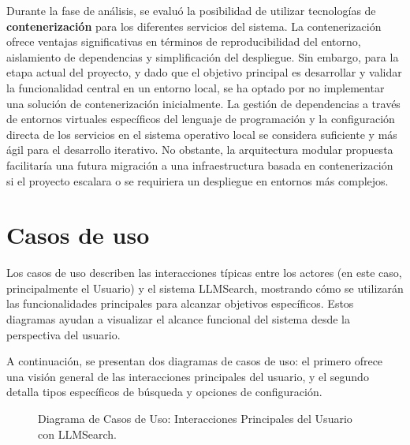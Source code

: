 Durante la fase de análisis, se evaluó la posibilidad de utilizar tecnologías de \textbf{contenerización} para los diferentes servicios del sistema. La contenerización ofrece ventajas significativas en términos de reproducibilidad del entorno, aislamiento de dependencias y simplificación del despliegue. Sin embargo, para la etapa actual del proyecto, y dado que el objetivo principal es desarrollar y validar la funcionalidad central en un entorno local, se ha optado por no implementar una solución de contenerización inicialmente. La gestión de dependencias a través de entornos virtuales específicos del lenguaje de programación y la configuración directa de los servicios en el sistema operativo local se considera suficiente y más ágil para el desarrollo iterativo. No obstante, la arquitectura modular propuesta facilitaría una futura migración a una infraestructura basada en contenerización si el proyecto escalara o se requiriera un despliegue en entornos más complejos.

\section{Casos de uso}
\label{sec:casos_de_uso}

Los casos de uso describen las interacciones típicas entre los actores (en este caso, principalmente el Usuario) y el sistema LLMSearch, mostrando cómo se utilizarán las funcionalidades principales para alcanzar objetivos específicos. Estos diagramas ayudan a visualizar el alcance funcional del sistema desde la perspectiva del usuario.

A continuación, se presentan dos diagramas de casos de uso: el primero ofrece una visión general de las interacciones principales del usuario, y el segundo detalla tipos específicos de búsqueda y opciones de configuración.

\begin{figure}[H]
  \centering
  \caption{Diagrama de Casos de Uso: Interacciones Principales del Usuario con LLMSearch.}
  \label{fig:casos_uso_general}
\end{figure}

